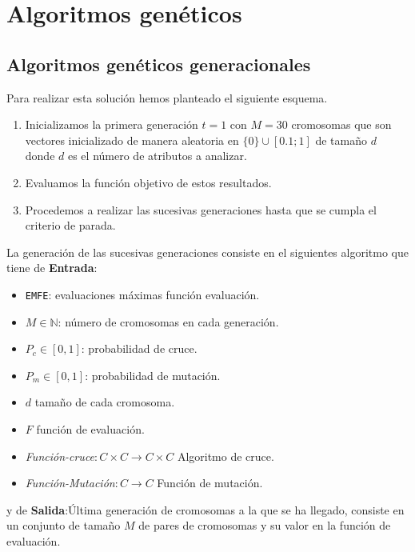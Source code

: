 
\section{ Algoritmos genéticos}
\subsection{Algoritmos genéticos generacionales}  
Para realizar esta solución hemos planteado el siguiente esquema. 

\begin{enumerate}
    \item Inicializamos la primera generación $t=1$ con $M = 30$ cromosomas que son
    vectores inicializado de manera aleatoria en $\{0\} \cup [0.1; 1]$ de tamaño $d$  donde $d$ es el número de atributos a analizar.  
    \item  Evaluamos la función objetivo de estos resultados. 
    \item Procedemos a realizar las sucesivas generaciones hasta que se cumpla el criterio de parada. 
\end{enumerate}

La generación de las sucesivas generaciones consiste en el siguientes algoritmo que tiene de  
\textbf{Entrada}:
        \begin{itemize}
          \item \texttt{EMFE}: evaluaciones máximas función evaluación.
          \item $M \in \mathbb{N}$: número de cromosomas en cada generación. 
          \item $P_c \in [0,1]$: probabilidad de cruce. 
          \item $P_m \in [0,1]$: probabilidad de mutación. 
          \item $d$ tamaño de cada cromosoma. 
          \item $F$ función de evaluación. 
          \item \textit{Función-cruce}$: C \times C \longrightarrow C \times C$ Algoritmo de cruce. 
          \item \textit{Función-Mutación}$: C \longrightarrow C $ Función de mutación. 
        \end{itemize}

y de 
\textbf{Salida}:Última generación de cromosomas a la que se ha llegado,
        consiste en un conjunto de tamaño $M$ de pares de cromosomas y su valor en la función de evaluación.

